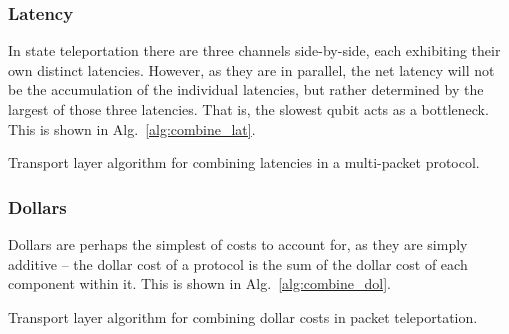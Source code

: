 \documentclass[aps, rmp, twocolumn, amsmath, amssymb, nofootinbib, superscriptaddress, longbibliography, floatfix, table-of-contents, eqsecnum]{revtex4-1}
\newcommand{\comment}[1]{{\color{blue}{\textbf{#1}}}}
\begin{document}
\subsubsection{Latency} 

In state teleportation there are three channels side-by-side, each exhibiting their own distinct latencies. However, as they are in parallel, the net latency will not be the accumulation of the individual latencies, but rather determined by the largest of those three latencies. That is, the slowest qubit acts as a bottleneck. This is shown in Alg.~\ref{alg:combine_lat}.

\begin{table}[!htb]
\caption{Transport layer algorithm for combining latencies in a multi-packet protocol.} \label{alg:combine_lat}
\end{table}

\comment{To do}

%
%

\subsubsection{Dollars} 

Dollars are perhaps the simplest of costs to account for, as they are simply additive -- the dollar cost of a protocol is the sum of the dollar cost of each component within it. This is shown in Alg.~\ref{alg:combine_dol}.

\begin{table}[!htb]
\caption{Transport layer algorithm for combining dollar costs in packet teleportation.} \label{alg:combine_dol}
\end{table}
\end{document}
